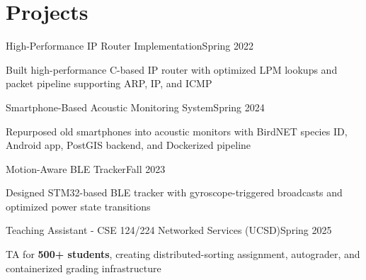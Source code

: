 \section{Projects}

% 
% 
% 
% 

\begin{joblong}{High-Performance IP Router Implementation}{Spring 2022}
	\item Built high-performance C-based IP router with optimized LPM lookups and packet pipeline supporting ARP, IP, and ICMP
\end{joblong}

\begin{joblong}{Smartphone-Based Acoustic Monitoring System}{Spring 2024}
	\item Repurposed old smartphones into acoustic monitors with BirdNET species ID, Android app, PostGIS backend, and Dockerized pipeline
\end{joblong}

\begin{joblong}{Motion-Aware BLE Tracker}{Fall 2023}
	\item Designed STM32-based BLE tracker with gyroscope-triggered broadcasts and optimized power state transitions
\end{joblong}

\begin{joblong}{Teaching Assistant - CSE 124/224 Networked Services (UCSD)}{Spring 2025}
	\item TA for \textbf{500+ students}, creating distributed-sorting assignment, autograder, and containerized grading infrastructure
\end{joblong}
